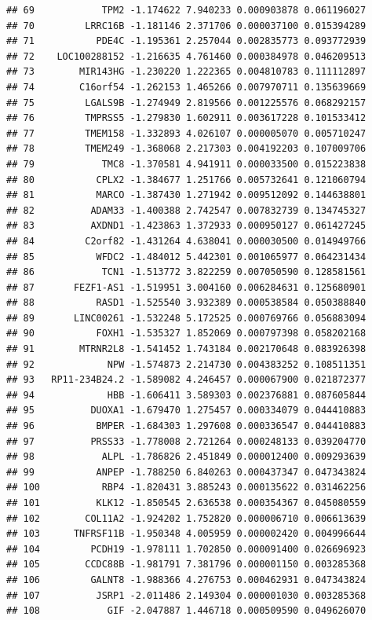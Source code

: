 \documentclass[
]{article}
\begin{document}
\begin{verbatim}
## 69            TPM2 -1.174622 7.940233 0.000903878 0.061196027
## 70         LRRC16B -1.181146 2.371706 0.000037100 0.015394289
## 71           PDE4C -1.195361 2.257044 0.002835773 0.093772939
## 72    LOC100288152 -1.216635 4.761460 0.000384978 0.046209513
## 73        MIR143HG -1.230220 1.222365 0.004810783 0.111112897
## 74        C16orf54 -1.262153 1.465266 0.007970711 0.135639669
## 75         LGALS9B -1.274949 2.819566 0.001225576 0.068292157
## 76         TMPRSS5 -1.279830 1.602911 0.003617228 0.101533412
## 77         TMEM158 -1.332893 4.026107 0.000005070 0.005710247
## 78         TMEM249 -1.368068 2.217303 0.004192203 0.107009706
## 79            TMC8 -1.370581 4.941911 0.000033500 0.015223838
## 80           CPLX2 -1.384677 1.251766 0.005732641 0.121060794
## 81           MARCO -1.387430 1.271942 0.009512092 0.144638801
## 82          ADAM33 -1.400388 2.742547 0.007832739 0.134745327
## 83          AXDND1 -1.423863 1.372933 0.000950127 0.061427245
## 84         C2orf82 -1.431264 4.638041 0.000030500 0.014949766
## 85           WFDC2 -1.484012 5.442301 0.001065977 0.064231434
## 86            TCN1 -1.513772 3.822259 0.007050590 0.128581561
## 87       FEZF1-AS1 -1.519951 3.004160 0.006284631 0.125680901
## 88           RASD1 -1.525540 3.932389 0.000538584 0.050388840
## 89       LINC00261 -1.532248 5.172525 0.000769766 0.056883094
## 90           FOXH1 -1.535327 1.852069 0.000797398 0.058202168
## 91        MTRNR2L8 -1.541452 1.743184 0.002170648 0.083926398
## 92             NPW -1.574873 2.214730 0.004383252 0.108511351
## 93   RP11-234B24.2 -1.589082 4.246457 0.000067900 0.021872377
## 94             HBB -1.606411 3.589303 0.002376881 0.087605844
## 95          DUOXA1 -1.679470 1.275457 0.000334079 0.044410883
## 96           BMPER -1.684303 1.297608 0.000336547 0.044410883
## 97          PRSS33 -1.778008 2.721264 0.000248133 0.039204770
## 98            ALPL -1.786826 2.451849 0.000012400 0.009293639
## 99           ANPEP -1.788250 6.840263 0.000437347 0.047343824
## 100           RBP4 -1.820431 3.885243 0.000135622 0.031462256
## 101          KLK12 -1.850545 2.636538 0.000354367 0.045080559
## 102        COL11A2 -1.924202 1.752820 0.000006710 0.006613639
## 103      TNFRSF11B -1.950348 4.005959 0.000002420 0.004996644
## 104         PCDH19 -1.978111 1.702850 0.000091400 0.026696923
## 105        CCDC88B -1.981791 7.381796 0.000001150 0.003285368
## 106         GALNT8 -1.988366 4.276753 0.000462931 0.047343824
## 107          JSRP1 -2.011486 2.149304 0.000001030 0.003285368
## 108            GIF -2.047887 1.446718 0.000509590 0.049626070

\end{verbatim}
\end{document}
